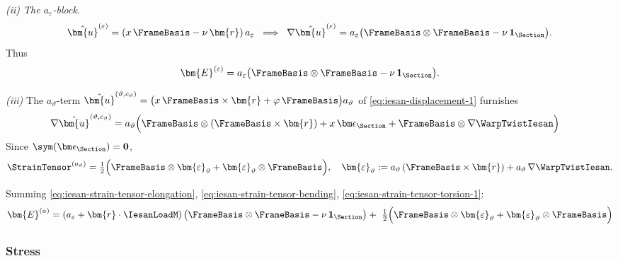 \medskip
\noindent\emph{(ii) The \(a_{\varepsilon}\)-block.}
\[
\hat{\bm{u}}^{(\varepsilon)}=(x\,\FrameBasis-\nu\,\bm{r})\,a_\varepsilon
\;\;\Longrightarrow\;\;
\nabla\hat{\bm{u}}^{(\varepsilon)}=a_\varepsilon\big(\FrameBasis\otimes\FrameBasis-\nu\,\mathbf{1}_\Section\big).
\]
Thus
\begin{equation}
\bm{E}^{(\varepsilon)}
=a_\varepsilon\big(\FrameBasis\otimes\FrameBasis-\nu\,\mathbf{1}_\Section\big).
\label{eq:iesan-strain-tensor-elongation}
\end{equation}

\medskip
\noindent\emph{(iii)}
The \(a_{\vartheta}\)-term 
\(
\hat{\bm{u}}^{(\vartheta,c_\vartheta)}
=\big(x\,\FrameBasis\times\bm {r}+\varphi\,\FrameBasis\big)a_\vartheta
\)
of \eqref{eq:iesan-displacement-1} furnishes
\[
\begin{aligned}
\nabla\hat{\bm{u}}^{(\vartheta,c_\vartheta)}
&= a_\vartheta\Big(\FrameBasis\otimes(\FrameBasis\times\bm{r})+x\,\bm\epsilon_\Section+\FrameBasis\otimes\nabla \WarpTwistIesan\Big)
\end{aligned}
\]
Since \(\sym(\bm\epsilon_\Section)=\mathbf{0}\),
\begin{equation}
\StrainTensor^{(a_\vartheta)}
=\tfrac12\Big(
\FrameBasis\otimes\bm{\varepsilon}_{\vartheta}
+\bm{\varepsilon}_{\vartheta}\otimes\FrameBasis
\Big),
\quad
\bm{\varepsilon}_{\vartheta}:= a_\vartheta\,(\FrameBasis\times\bm{r})
+a_\vartheta\,\nabla \WarpTwistIesan.
\label{eq:iesan-strain-tensor-torsion-1}
\end{equation}

Summing \eqref{eq:iesan-strain-tensor-elongation}, \eqref{eq:iesan-strain-tensor-bending}, \eqref{eq:iesan-strain-tensor-torsion-1}:
\begin{equation}
\begin{aligned}
\bm{E}^{(a)}
&= (a_{\varepsilon} + \bm{r}\cdot\IesanLoadM)\,\big(\FrameBasis\otimes\FrameBasis-\nu\,\mathbf{1}_\Section\big)
+\ \tfrac12\Big(\FrameBasis\otimes\bm{\varepsilon}_{\vartheta}+\bm{\varepsilon}_{\vartheta}\otimes\FrameBasis\Big) \\[2pt]
\end{aligned}
\label{eq:iesan-strain-tensor-1}
\end{equation}



\subsubsection{Stress}

